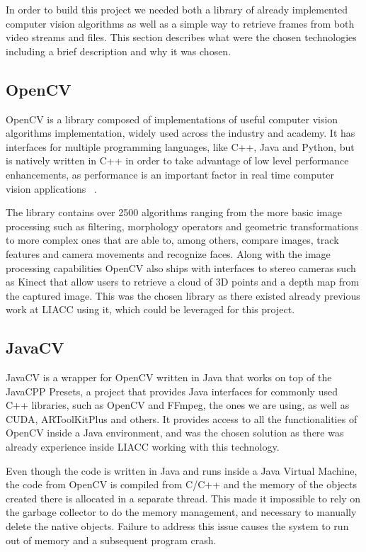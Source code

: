 In order to build this project we needed both a library of already implemented computer vision algorithms as well as a simple way to retrieve frames from both video streams and files. This section describes what were the chosen technologies including a brief description and why it was chosen.

\subsection{OpenCV}
OpenCV is a library composed of implementations of useful computer vision algorithms implementation, widely used across the industry and academy. It has interfaces for multiple programming languages, like C++, Java and Python, but is natively written in C++ in order to take advantage of low level performance enhancements, as performance is an important factor in real time computer vision applications ~\cite{opencv_about_2017}.

The library contains over 2500 algorithms ranging from the more basic image processing such as filtering, morphology operators and geometric transformations to more complex ones that are able to, among others, compare images, track features and camera movements and recognize faces. Along with the image processing capabilities OpenCV also ships with interfaces to stereo cameras such as Kinect that allow users to retrieve a cloud of 3D points and a depth map from the captured image. This was the chosen library as there existed already previous work at LIACC using it, which could be leveraged for this project.

\subsection{JavaCV}
JavaCV is a wrapper for OpenCV written in Java that works on top of the JavaCPP Presets, a project that provides Java interfaces for commonly used C++ libraries, such as OpenCV and FFmpeg, the ones we are using, as well as CUDA, ARToolKitPlus and others. It provides access to all the functionalities of OpenCV inside a Java environment, and was the chosen solution as there was already experience inside LIACC working with this technology.

Even though the code is written in Java and runs inside a Java Virtual Machine, the code from OpenCV is compiled from C/C++ and the memory of the objects created there is allocated in a separate thread. This made it impossible to rely on the garbage collector to do the memory management, and necessary to manually delete the native objects. Failure to address this issue causes the system to run out of memory and a subsequent program crash.

